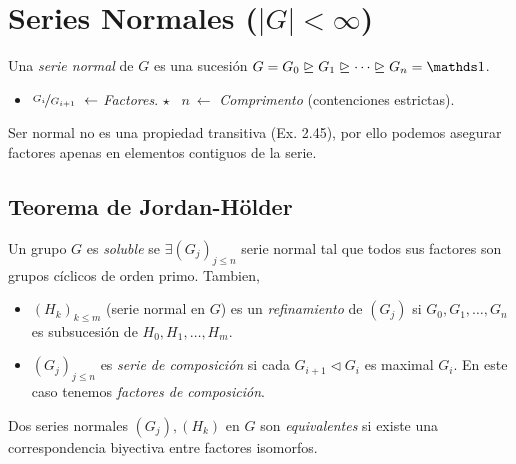 \section{Series Normales (\(|G|< \infty\))}

\begin{definition}
    Una \emph{serie normal} de \(G\) es una sucesión \(G = G_0 \trianglerighteq G_1 \trianglerighteq \cdots \trianglerighteq G_n = \id\).  %
    \vspace{-0.3cm}
    \begin{itemize}[label = \(\star\), left = 1cm]
        \item \(\nicefrac{G_{i}}{G_{i+1}} \ \leftarrow\)  \emph{Factores}. \hfill \(\star\) \ \(n \ \leftarrow \) \emph{Comprimento} (contenciones estrictas).
    \end{itemize}
\end{definition}

\begin{note}
    Ser normal no es una propiedad transitiva (\textcolor{rojoscuro}{Ex. 2.45}), por ello podemos asegurar factores apenas en elementos contiguos de la serie. 
\end{note}

\subsection*{Teorema de Jordan-Hölder}
\begin{definition}
    Un grupo \(G\) es \emph{soluble} se \(\exists (G_j)_{j\leq n}\) serie normal tal que todos sus factores son grupos cíclicos de orden primo. Tambien, 
    \vspace{-0.3cm}
    \begin{itemize}[label = \(\star\), left = 1cm]
        \item \((H_k)_{k\leq m}\) (serie normal en \(G\)) es un \emph{refinamiento} de \((G_j)\) si \(G_0, G_1, \ldots, G_n\) es subsucesión de \(H_0, H_1, \ldots, H_m\).
        \item \((G_j)_{j\leq n}\) es \emph{serie de composición} si cada \(G_{i+1}\lhd G_i\) es maximal \(G_i\). En este caso tenemos \emph{factores de composición}.     
    \end{itemize}
\end{definition}

\vspace{-0.3cm}
\begin{definition}
    Dos series normales \((G_j), (H_k)\) en \(G\) son \emph{equivalentes} si existe una correspondencia biyectiva entre factores isomorfos. 
\end{definition}

